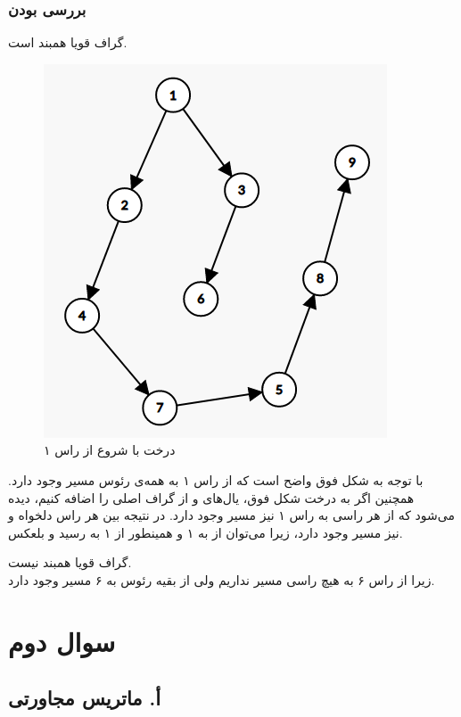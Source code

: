 \documentclass{article}
\begin{document}
\begin{multicols}{2}
\subsubsection*{بررسی  بودن}
گراف
قویا همبند است.
\begin{figure}[H]
    \center
    \includegraphics[width=0.8\linewidth]{Photos/HW1/dfs.png}
    \caption{درخت  با شروع از راس ۱}
    \label{fig:my_label}
\end{figure}
با توجه به شکل فوق واضح است که از راس ۱ به همه‌ی رئوس مسیر وجود دارد. همچنین
اگر به درخت شکل فوق، یال‌های
و
از گراف اصلی را اضافه کنیم، دیده می‌شود که از هر راسی به راس ۱ نیز مسیر وجود دارد. در نتیجه بین هر راس دلخواه
و
نیز مسیر وجود دارد، زیرا می‌توان از
به ۱ و همینطور از ۱ به
رسید و بلعکس.

گراف
قویا همبند نیست.\\
زیرا از راس ۶ به هیچ راسی مسیر نداریم ولی از بقیه رئوس به ۶ مسیر وجود دارد.

\section*{سوال دوم}

\subsection*{أ. ماتریس مجاورتی }


\end{multicols}
\end{document}
